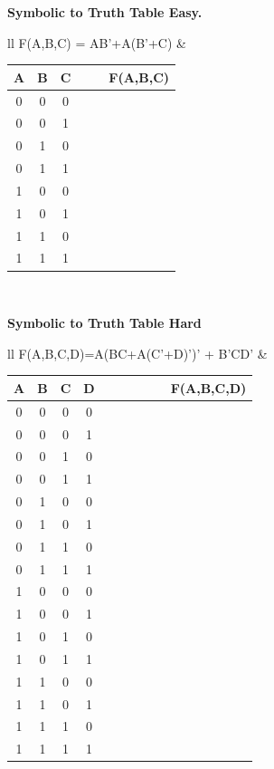 \pagebreak
{\bf Symbolic to Truth Table Easy.}

\begin{tabular}{ll}
	F(A,B,C) = AB'+A(B'+C) & \\
	\begin{tabular}{c|c|c|c|c||c}
	A & B & C &   &    &  F(A,B,C) \\ \hline \hline
	0 & 0 & 0 &   &    &    \\ \hline
	0 & 0 & 1 &   &    &    \\ \hline
	0 & 1 & 0 &   &    &    \\ \hline
	0 & 1 & 1 &   &    &    \\ \hline
	1 & 0 & 0 &   &    &    \\ \hline
	1 & 0 & 1 &   &    &    \\ \hline
	1 & 1 & 0 &   &    &    \\ \hline
	1 & 1 & 1 &   &    &    \\
	\end{tabular} \\ 
\end{tabular}

\vspace{0.2in}

{\bf Symbolic to Truth Table Hard}

\begin{tabular}{ll}
	F(A,B,C,D)=A(BC+A(C'+D)')' + B'CD'  & \\
	\begin{tabular}{c|c|c|c||p{0.1in}|p{0.2in}|p{0.2in}|p{0.2in}|p{0.2in}||c}
	A & B & C & D &   &    &  &  &  & F(A,B,C,D) \\ \hline \hline
	0 & 0 & 0 & 0 &   &    &  &  &  &   \\ \hline
	0 & 0 & 0 & 1 &   &    &  &  &  &   \\ \hline
	0 & 0 & 1 & 0 &   &    &  &  &  &   \\ \hline
	0 & 0 & 1 & 1 &   &    &  &  &  &   \\ \hline
	0 & 1 & 0 & 0 &   &    &  &  &  &   \\ \hline
	0 & 1 & 0 & 1 &   &    &  &  &  &   \\ \hline
	0 & 1 & 1 & 0 &   &    &  &  &  &   \\ \hline
	0 & 1 & 1 & 1 &   &    &  &  &  &   \\ \hline
	1 & 0 & 0 & 0 &   &    &  &  &  &   \\ \hline
	1 & 0 & 0 & 1 &   &    &  &  &  &   \\ \hline
	1 & 0 & 1 & 0 &   &    &  &  &  &   \\ \hline
	1 & 0 & 1 & 1 &   &    &  &  &  &   \\ \hline
	1 & 1 & 0 & 0 &   &    &  &  &  &   \\ \hline
	1 & 1 & 0 & 1 &   &    &  &  &  &   \\ \hline
	1 & 1 & 1 & 0 &   &    &  &  &  &   \\ \hline
	1 & 1 & 1 & 1 &   &    &  &  &  &   \\ 
	\end{tabular} \\ 
\end{tabular}


